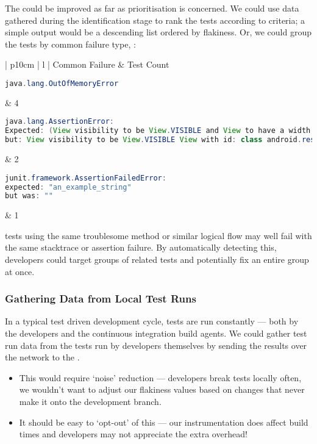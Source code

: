 The \jenkinsPlugin could be improved as far as prioritisation is concerned.
We could use data gathered during the identification stage to rank the tests
according to criteria; a simple output would be a descending list ordered by
flakiness. Or, we could group the tests by common failure type, \eg:
\begin{center}
    \begin{tabular}{| p{10cm} | l |}
    \hline
    Common Failure & \flaky Test Count \\ \hline
    {\begin{lstlisting}[language=Java, numbers=none]
java.lang.OutOfMemoryError
	\end{lstlisting}}
    & 4 \\ \hline
    {\begin{lstlisting}[language=Java, numbers=none]
java.lang.AssertionError:
Expected: (View visibility to be View.VISIBLE and View to have a width and a height)
but: View visibility to be View.VISIBLE View with id: class android.resources.R$id.anExampleView(1) had a visibility of View.GONE
	\end{lstlisting}}
	& 2 \\ \hline
    {\begin{lstlisting}[language=Java, numbers=none]
junit.framework.AssertionFailedError:
expected: "an_example_string"
but was: ""
	\end{lstlisting}}
	& 1 \\ \hline

    \end{tabular}
\end{center}

\Flaky tests using the same troublesome method or similar logical flow may well
fail with the same stacktrace or assertion failure. By automatically detecting
this, developers could target groups of related tests and potentially fix an
entire group at once.

\subsubsection{Gathering Data from Local Test Runs}

In a typical test driven development cycle, tests are run constantly --- both by
the developers and the continuous integration build agents. We could gather test
run data from the tests run by developers themselves by sending the results over
the network to the \jenkinsPlugin.

\begin{itemize}
	\item This would require {\lq}noise{\rq} reduction --- developers break tests
	locally often, we wouldn't want to adjust our flakiness values based on
	changes that never make it onto the development branch.
	\item It should be easy to {\lq}opt-out{\rq} of this --- our instrumentation
	does affect build times and developers may not appreciate the extra overhead!
\end{itemize}

